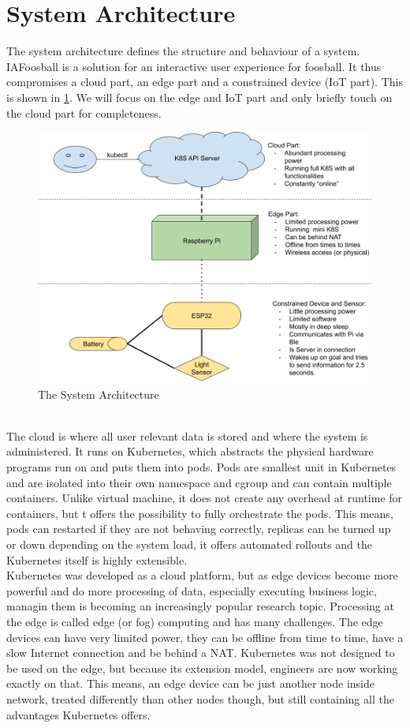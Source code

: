 \section{System Architecture}
The system architecture defines the structure and behaviour of a system. IAFoosball is a solution for an interactive user experience for foosball. It thus compromises a cloud part, an edge part and a constrained device (IoT part). This is shown in \cref{fig:systemArch}. We will focus on the edge and IoT part and only briefly touch on the cloud part for completeness. 
\begin{figure}[h!]
    \centering
    \includegraphics[scale=0.3]{figures/system-arch.png}
    \caption{The System Architecture}\label{fig:systemArch}
\end{figure}\\
The cloud is where all user relevant data is stored and where the system is administered. It runs on Kubernetes, which abstracts the physical hardware programs run on and puts them into pods. Pods are smallest unit in Kubernetes and are isolated into their own namespace and cgroup and can contain multiple containers. Unlike virtual machine, it does not create any overhead at runtime for containers, but t offers the possibility to fully orchestrate the pods. This means, pods can restarted if they are not behaving correctly, replicas can be turned up or down depending on the system load, it offers automated rollouts and the Kubernetes itself is highly extensible.\\
Kubernetes was developed as a cloud platform, but as edge devices become more powerful and do more processing of data, especially executing business logic, managin them is becoming an increasingly popular research topic. Processing at the edge is called edge (or fog) computing and has many challenges. The edge devices can have very limited power, they can be offline from time to time, have a slow Internet connection and be behind a NAT. Kubernetes was not designed to be used on the edge, but because its extension model, engineers are now working exactly on that. This means, an edge device can be just another node inside network, treated differently than other nodes though, but still containing all the advantages Kubernetes offers.\\
